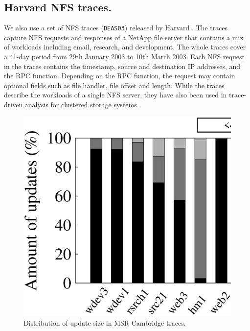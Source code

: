 \subsection{Harvard NFS traces.}  We also use a set of NFS traces
(\texttt{DEAS03}) released by Harvard \cite{ellard04}.  The traces capture NFS
requests and responses of a NetApp file server 
that contains a mix of workloads including email, research, and development.
The whole traces cover a 41-day period from 29th January 2003 to 10th March
2003.  Each NFS request in the traces contains the timestamp, source and
destination IP addresses, and the RPC function. 
Depending on the RPC function, the request may contain optional fields such as
file handler, file offset and length.  While the traces describe the
workloads of a single NFS server, they have also been used in trace-driven
analysis for clustered storage systems \cite{abd05,hendricks06}.


\begin{figure}[t]
    \centering
    \includegraphics[width=\linewidth]{charts/msr_dist/eps/msr_dist}
    \caption{Distribution of update size in MSR Cambridge traces.}
    \label{fig:msr_dist}
\end{figure}

